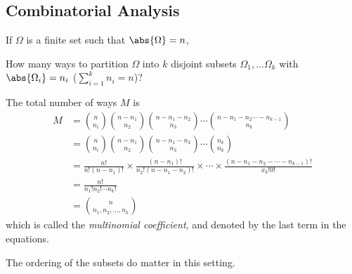 \subsection{Combinatorial Analysis}
If \(\Omega\) is a finite set such that \(\abs{\Omega} = n\),
\begin{problem}
    How many ways to partition \(\Omega\) into \(k\) disjoint subsets \(\Omega_1, \ldots \Omega_k \) with \(\abs{\Omega_i} =n_i\) (\(\sum\limits_{i=1}^{k} n_i = n\))?
\end{problem}
The total number of ways \(M\) is
\begin{align*}
    M &= \binom{n}{n_i} \binom{n-n_1}{n_2} \binom{n - n_1 - n_2}{n_3}\cdots \binom{n - n_1 - n_2 \cdots - n_{k - 1}}{n_k}\\
    &= \binom{n}{n_i} \binom{n-n_1}{n_2} \binom{n - n_1 - n_2}{n_3}\cdots \binom{n_k}{n_k}\\
    &= \frac{n!}{n!(n - n_1)!}\times \frac{(n-n_1)!}{n_2!(n-n_{1}-n_2)!}\times \cdots\times \frac{(n - n_1 - n_2 - \cdots - n_{k-1})!}{x_k!0!}\\
    &=\frac{n!}{n_1!n_2!\cdots n_k!}\\
    &=\binom{n}{n_1,n_2, \ldots ,n_k}
\end{align*}
which is called the \textit{multinomial coefficient}, and denoted by the last term in the equations.
\begin{remark}
    The ordering of the subsets do matter in this setting.
\end{remark}

